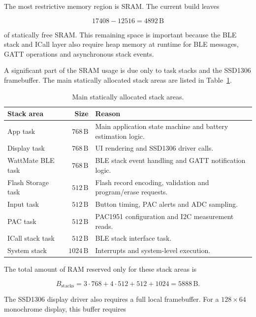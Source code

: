 The most restrictive memory region is SRAM. The current build leaves

\[
17408 - 12516 = 4892\,\mathrm{B}
\]

of statically free SRAM. This remaining space is important because the BLE stack
and ICall layer also require heap memory at runtime for BLE messages, GATT
operations and asynchronous stack events.

A significant part of the SRAM usage is due only to task stacks and the SSD1306
framebuffer. The main statically allocated stack areas are listed in
Table~\ref{tab:firmware_stack_allocation}.

\begin{table}[H]
	\centering
	\small
	\caption{Main statically allocated stack areas.}
	\label{tab:firmware_stack_allocation}
	\begin{tabularx}{\textwidth}{l r X}
		\toprule
		\textbf{Stack area} & \textbf{Size} & \textbf{Reason} \\
		\midrule
		App task & \(768\,\mathrm{B}\) & Main application state machine and battery estimation logic. \\
		Display task & \(768\,\mathrm{B}\) & UI rendering and SSD1306 driver calls. \\
		WattMate BLE task & \(768\,\mathrm{B}\) & BLE stack event handling and GATT notification logic. \\
		Flash Storage task & \(512\,\mathrm{B}\) & Flash record encoding, validation and program/erase requests. \\
		Input task & \(512\,\mathrm{B}\) & Button timing, PAC alerts and ADC sampling. \\
		PAC task & \(512\,\mathrm{B}\) & PAC1951 configuration and I2C measurement reads. \\
		ICall stack task & \(512\,\mathrm{B}\) & BLE stack interface task. \\
		System stack & \(1024\,\mathrm{B}\) & Interrupts and system-level execution. \\
		\bottomrule
	\end{tabularx}
\end{table}

The total amount of RAM reserved only for these stack areas is

\[
B_{\mathrm{stacks}} =
3 \cdot 768 +
4 \cdot 512 +
512 +
1024
=
5888\,\mathrm{B}.
\]

The SSD1306 display driver also requires a full local framebuffer. For a
\(128 \times 64\) monochrome display, this buffer requires

